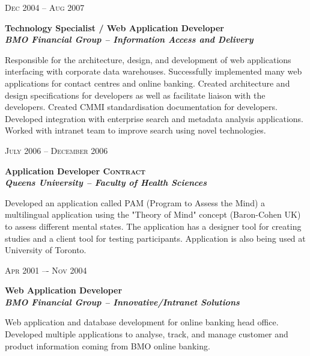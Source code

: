 \documentclass[9pt]{article} %
\begin{document}
{\begin{minipage}[t]{0.5\textwidth}
{\raggedleft\textsc{Dec 2004 -- Aug 2007}\par}

{\raggedright\bf Technology Specialist / Web Application Developer\\
{\it BMO Financial Group – Information Access and Delivery}\\}

\normalsize{Responsible for the architecture, design, and development of web applications interfacing with corporate data warehouses. Successfully implemented many web applications for contact centres and online banking. Created architecture and design specifications for developers as well as facilitate liaison with the developers. Created CMMI standardisation documentation for developers. Developed integration with enterprise search and metadata analysis applications. Worked with intranet team to improve search using novel technologies.}\\


{\raggedleft\textsc{July 2006 – December 2006}\par}

{\raggedright\bf Application Developer \textsc{Contract}\\
{\it Queens University – Faculty of Health Sciences}\\}

\normalsize{Developed an application called PAM (Program to Assess the Mind) a multilingual application using the "Theory of Mind" concept (Baron-Cohen UK) to assess different mental states. The application has a designer tool for creating studies and a client tool for testing participants. 
Application is also being used at University of Toronto.}\\


{\raggedleft\textsc{Apr 2001 –- Nov 2004}\par}

{\raggedright\bf Web Application Developer\\
{\it BMO Financial Group – Innovative/Intranet Solutions}\\}

\normalsize{Web application and database development for online banking head office. Developed multiple applications to analyse, track, and manage customer and product information coming from BMO online banking.}\\


\end{minipage}}
\end{document}
